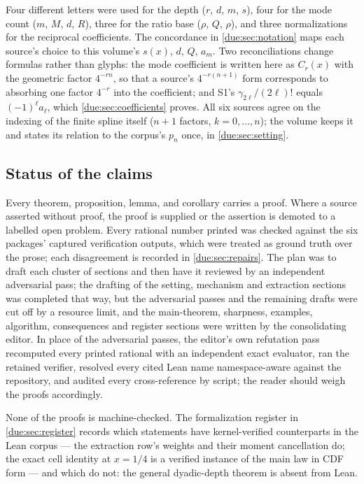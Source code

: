 \documentclass[11pt,oneside]{article}
\theoremstyle{plain}
\theoremstyle{definition}
\theoremstyle{remark}
\newcommand{\dep}[1]{s\!\left(#1\right)}                    %
\newcommand{\Qq}{Q}                                         %
\newcommand{\am}[1]{a_{#1}}                                 %
\newcommand{\Cr}[2]{C_{#1}\!\left(#2\right)}                %
\begin{document}
Four different letters were used for the depth (\(r\), \(d\), \(m\), \(s\)),
four for the mode count (\(m\), \(M\), \(d\), \(R\)), three for the ratio base
(\(\rho\), \(Q\), \(\rho\)), and three normalizations for the reciprocal
coefficients.  The concordance in \cref{due:sec:notation} maps each source's
choice to this volume's \(\dep{x}\), \(d\), \(\Qq\), \(\am{m}\).  Two
reconciliations change formulas rather than glyphs: the mode coefficient is
written here as \(\Cr{r}{x}\) with the geometric factor \(4^{-rn}\), so that a
source's \(4^{-r(n+1)}\) form corresponds to absorbing one factor \(4^{-r}\)
into the coefficient; and S1's \(\gamma_{2\ell}/(2\ell)!\) equals
\((-1)^{\ell}\am{\ell}\), which \cref{due:sec:coefficients} proves.  All six
sources agree on the indexing of the finite spline itself (\(n+1\) factors,
\(k=0,\ldots,n\)); the volume keeps it and states its relation to the corpus's
\(p_{n}\) once, in \cref{due:sec:setting}.

\subsection{Status of the claims}

Every theorem, proposition, lemma, and corollary carries a proof.  Where a
source asserted without proof, the proof is supplied or the assertion is
demoted to a labelled open problem.  Every rational number printed was checked
against the six packages' captured verification outputs, which were treated as
ground truth over the prose; each disagreement is recorded in
\cref{due:sec:repairs}.  The plan was to draft each cluster of sections and
then have it reviewed by an independent adversarial pass; the drafting of
the setting, mechanism and extraction sections was completed that way, but
the adversarial passes and the remaining drafts were cut off by a resource
limit, and the main-theorem, sharpness, examples, algorithm, consequences and
register sections were written by the consolidating editor.  In place of the
adversarial passes, the editor's own refutation pass recomputed every printed
rational with an independent exact evaluator, ran the retained verifier,
resolved every cited Lean name namespace-aware against the repository, and
audited every cross-reference by script; the reader should weigh the proofs
accordingly.

None of the proofs is machine-checked.  The formalization register in
\cref{due:sec:register} records which statements have kernel-verified
counterparts in the Lean corpus --- the extraction row's weights and their
moment cancellation do; the exact cell identity at \(x=1/4\) is a verified
instance of the main law in CDF form --- and which do not: the general
dyadic-depth theorem is absent from Lean.
\end{document}
